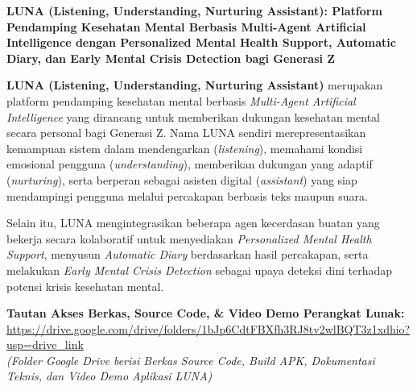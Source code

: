 
\begin{abstractbox}
\centering
\textbf{LUNA (Listening, Understanding, Nurturing Assistant): Platform Pendamping Kesehatan Mental Berbasis Multi-Agent Artificial Intelligence dengan Personalized Mental Health Support, Automatic Diary, dan Early Mental Crisis Detection bagi Generasi Z}
\end{abstractbox}

\indent
\textbf{LUNA (Listening, Understanding, Nurturing Assistant)} merupakan platform pendamping kesehatan mental berbasis \textit{Multi-Agent Artificial Intelligence} yang dirancang untuk memberikan dukungan kesehatan mental secara personal bagi Generasi Z. Nama LUNA sendiri merepresentasikan kemampuan sistem dalam mendengarkan (\textit{listening}), memahami kondisi emosional pengguna (\textit{understanding}), memberikan dukungan yang adaptif (\textit{nurturing}), serta berperan sebagai asisten digital (\textit{assistant}) yang siap mendampingi pengguna melalui percakapan berbasis teks maupun suara.

Selain itu, LUNA mengintegrasikan beberapa agen kecerdasan buatan yang bekerja secara kolaboratif untuk menyediakan \textit{Personalized Mental Health Support}, menyusun \textit{Automatic Diary} berdasarkan hasil percakapan, serta melakukan \textit{Early Mental Crisis Detection} sebagai upaya deteksi dini terhadap potensi krisis kesehatan mental.

\vspace{0.5em}
\begin{abstractbox}
\centering
\textbf{Tautan Akses Berkas, Source Code, \& Video Demo Perangkat Lunak:}\\[0.3em]
\small
\url{https://drive.google.com/drive/folders/1bJp6CdtFBXfh3RJ8tv2wlBQT3z1xdhio?usp=drive_link}\\[0.2em]
{\small\itshape (Folder Google Drive berisi Berkas Source Code, Build APK, Dokumentasi Teknis, dan Video Demo Aplikasi LUNA)}
\end{abstractbox}
